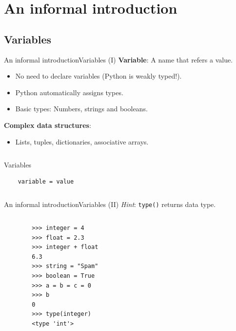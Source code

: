 \documentclass[10pt,compress]{beamer} %
\begin{document}
\section{An informal introduction}

\subsection{Variables}
\begin{frame}[fragile]{An informal introduction}{Variables (I)}
 	\textbf{Variable}: A name that refers a value.
	\begin{itemize}
		\item No need to declare variables (Python is weakly typed!).
		\item Python automatically assigns types.
		\item Basic types: Numbers, strings and booleans.
	\end{itemize}
	\textbf{Complex data structures}:
		\begin{itemize}
		\item Lists, tuples, dictionaries, associative arrays.
		\end{itemize}

    \begin{columns}
	\begin{block}{Variables}
	\begin{verbatim}
	variable = value
	\end{verbatim}
	\end{block}
	\end{columns}
\end{frame}

\begin{frame}[fragile]{An informal introduction}{Variables (II)}
	\centering \textit{Hint}: \texttt{type()} returns data type.

   	\begin{columns}
		\begin{block}{}
		\begin{verbatim}
		>>> integer = 4
		>>> float = 2.3
		>>> integer + float
		6.3
		>>> string = "Spam"
		>>> boolean = True
		>>> a = b = c = 0
		>>> b
		0
		>>> type(integer)
		<type 'int'>
		\end{verbatim}
		\end{block}
	\end{columns}
\end{frame}
\end{document}
